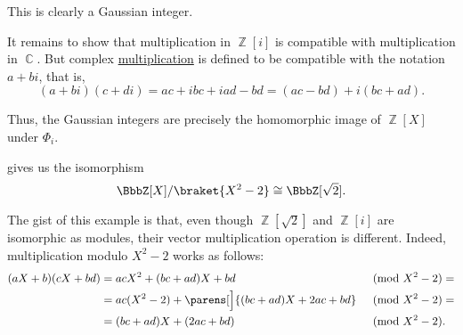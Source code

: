 \begin{example}
\begin{thmenum}
    This is clearly a Gaussian integer.

    It remains to show that multiplication in \( \BbbZ[i] \) is compatible with multiplication in \( \BbbC \). But complex \hyperref[def:complex_numbers]{multiplication} is defined to be compatible with the notation \( a + bi \), that is,
    \begin{equation*}
    (a + bi) (c + di)
    =
    ac + ibc + iad - bd
    =
    (ac - bd) + i(bc + ad).
    \end{equation*}

    Thus, the Gaussian integers are precisely the homomorphic image of \( \BbbZ[X] \) under \( \Phi_i \).
  \end{thmenum}
\end{example}

\begin{example}\label{ex:integers_with_sqrt2}
   gives us the isomorphism
  \begin{equation*}
    \BbbZ[X] / \braket{X^2 - 2} \cong \BbbZ[\sqrt 2].
  \end{equation*}

  The gist of this example is that, even though \( \BbbZ[\sqrt 2] \) and \( \BbbZ[i] \) are isomorphic as modules, their vector multiplication operation is different. Indeed, multiplication modulo \( X^2 - 2 \) works as follows:
  \begin{align*}
    (aX + b) (cX + bd)
    &=
    acX^2 + (bc + ad)X + bd
    &\pmod {X^2 - 2} = \\ &=
    ac(X^2 - 2) + \parens[\Big]{ (bc + ad)X + 2ac + bd }
    &\pmod {X^2 - 2} = \\ &=
    (bc + ad)X + (2ac + bd)
    &\pmod {X^2 - 2}. \phantom{=}
  \end{align*}
\end{example}
